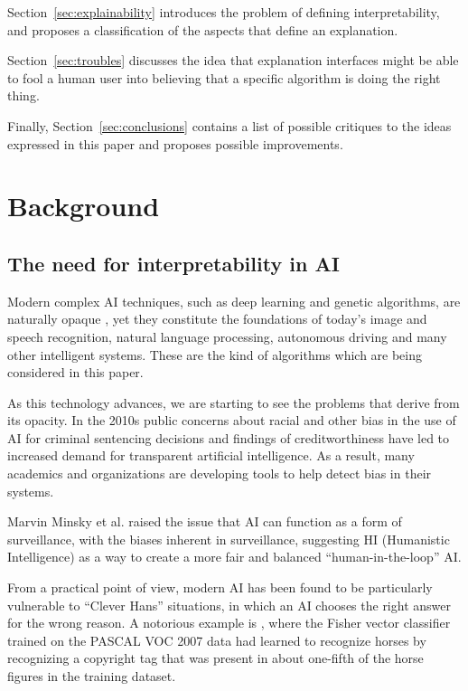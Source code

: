 \documentclass[conference]{IEEEtran}
\newcommand{\cit}[1][]{\todo[tickmarkheight=0.2cm]{cit #1}}
\begin{document}
Section~\ref{sec:explainability} introduces the problem of defining
interpretability, and proposes a classification of the aspects that define an
explanation.

Section~\ref{sec:troubles} discusses the idea that explanation interfaces might be able to fool a human user into believing that a specific algorithm is doing the right thing.

Finally, Section~\ref{sec:conclusions} contains a list of possible critiques to
the ideas expressed in this paper and proposes possible improvements.

\section{Background}
\label{sec:background}

\subsection{The need for interpretability in AI}
\label{sec:opaque}

Modern complex AI techniques, such as deep learning and genetic algorithms, are naturally opaque \cit [24], yet they constitute the foundations of today's image and speech recognition, natural language processing, autonomous driving and many other intelligent systems. These are the kind of algorithms which are being considered in this paper.

As this technology advances, we are starting to see the problems that derive from its opacity. In the 2010s public concerns about racial and other bias in the use of AI for criminal sentencing decisions and findings of creditworthiness have led to increased demand for transparent artificial intelligence. \cit [1] As a result, many academics and organizations are developing tools to help detect bias in their systems. \cit [22]

Marvin Minsky et al. raised the issue that AI can function as a form of surveillance, with the biases inherent in surveillance, suggesting HI (Humanistic Intelligence) as a way to create a more fair and balanced ``human-in-the-loop'' AI. \cit[23]

From a practical point of view, modern AI has been found to be particularly vulnerable to ``Clever Hans'' situations, in which an AI chooses the right answer for the wrong reason. A notorious example is \citet{cleverhans}, where the Fisher vector classifier trained on the PASCAL VOC 2007 data had learned to recognize horses by recognizing a copyright tag that was present in about one-fifth of the horse figures in the training dataset.
\end{document}
